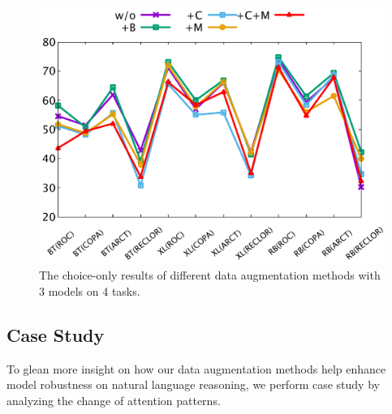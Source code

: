 %
\begin{figure}[th]
 	\centering
 	\includegraphics[width=0.9\columnwidth]{data/choice-only.pdf}
 	\caption{The choice-only results of different data augmentation 
methods with 3 models on 4 tasks.}
 	\label{fig:choice-only}
\end{figure}

\subsection{Case Study}
\label{sec:case}
To glean more insight on how our data augmentation methods help 
enhance model robustness on natural language reasoning, 
we perform case study by analyzing the change of attention patterns.

